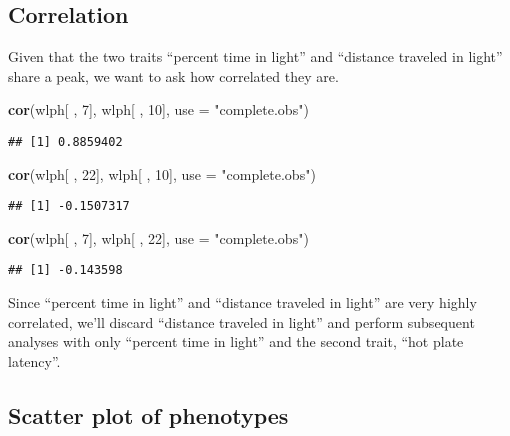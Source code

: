 \documentclass[oneside]{book}
\newenvironment{Shaded}{\begin{snugshade}}{\end{snugshade}}
\newcommand{\DataTypeTok}[1]{\textcolor[rgb]{0.13,0.29,0.53}{#1}}
\newcommand{\DecValTok}[1]{\textcolor[rgb]{0.00,0.00,0.81}{#1}}
\newcommand{\KeywordTok}[1]{\textcolor[rgb]{0.13,0.29,0.53}{\textbf{#1}}}
\newcommand{\NormalTok}[1]{#1}
\newcommand{\StringTok}[1]{\textcolor[rgb]{0.31,0.60,0.02}{#1}}
\begin{document}
\hypertarget{correlation}{%
\subsection{Correlation}\label{correlation}}

Given that the two traits ``percent time in light'' and ``distance
traveled in light'' share a peak, we want to ask how correlated they
are.

\begin{Shaded}
\begin{Highlighting}[]
\KeywordTok{cor}\NormalTok{(wlph[ , }\DecValTok{7}\NormalTok{], wlph[ , }\DecValTok{10}\NormalTok{], }\DataTypeTok{use =} \StringTok{"complete.obs"}\NormalTok{)}
\end{Highlighting}
\end{Shaded}

\begin{verbatim}
## [1] 0.8859402
\end{verbatim}

\begin{Shaded}
\begin{Highlighting}[]
\KeywordTok{cor}\NormalTok{(wlph[ , }\DecValTok{22}\NormalTok{], wlph[ , }\DecValTok{10}\NormalTok{], }\DataTypeTok{use =} \StringTok{"complete.obs"}\NormalTok{)}
\end{Highlighting}
\end{Shaded}

\begin{verbatim}
## [1] -0.1507317
\end{verbatim}

\begin{Shaded}
\begin{Highlighting}[]
\KeywordTok{cor}\NormalTok{(wlph[ , }\DecValTok{7}\NormalTok{], wlph[ , }\DecValTok{22}\NormalTok{], }\DataTypeTok{use =} \StringTok{"complete.obs"}\NormalTok{)}
\end{Highlighting}
\end{Shaded}

\begin{verbatim}
## [1] -0.143598
\end{verbatim}

Since ``percent time in light'' and ``distance traveled in light'' are
very highly correlated, we'll discard ``distance traveled in light'' and
perform subsequent analyses with only ``percent time in light'' and the
second trait, ``hot plate latency''.

\hypertarget{scatter-plot-of-phenotypes}{%
\subsection{Scatter plot of
phenotypes}\label{scatter-plot-of-phenotypes}}
\end{document}
